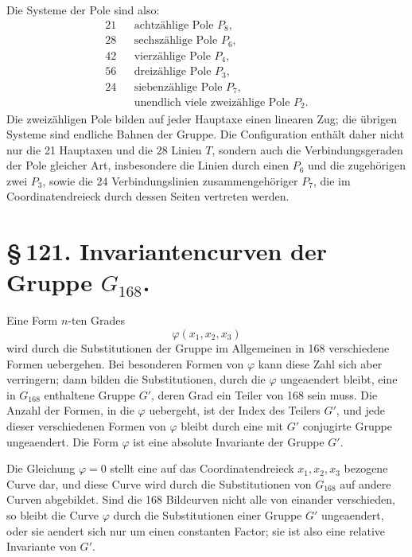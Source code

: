 \documentclass[11pt]{article}
\begin{document}
Die Systeme der Pole sind also:
\begin{equation}
\begin{array}{rcl}
21&&\text{achtzählige Pole }P_8,\\
28&&\text{sechszählige Pole }P_6,\\
42&&\text{vierzählige Pole }P_4,\\
56&&\text{dreizählige Pole }P_3,\\
24&&\text{siebenzählige Pole }P_7,\\
&&\text{unendlich viele zweizählige Pole }P_2.
\end{array}
\tag{2}
\end{equation}
Die zweizähligen Pole bilden auf jeder Hauptaxe einen linearen Zug; die übrigen Systeme sind endliche Bahnen der Gruppe. Die Configuration enthält daher nicht nur die 21 Hauptaxen und die 28 Linien \(T\), sondern auch die Verbindungsgeraden der Pole gleicher Art, insbesondere die Linien durch einen \(P_6\) und die zugehörigen zwei \(P_3\), sowie die 24 Verbindungslinien zusammengehöriger \(P_7\), die im Coordinatendreieck durch dessen Seiten vertreten werden.




\section*{\S\,121. Invariantencurven der Gruppe \(G_{168}\).}

Eine Form \(n\)-ten Grades
\begin{equation}
\varphi(x_1,x_2,x_3)
\end{equation}
wird durch die Substitutionen der Gruppe im Allgemeinen in 168 verschiedene Formen uebergehen. Bei besonderen Formen von \(\varphi\) kann diese Zahl sich aber verringern; dann bilden die Substitutionen, durch die \(\varphi\) ungeaendert bleibt, eine in \(G_{168}\) enthaltene Gruppe \(G'\), deren Grad ein Teiler von 168 sein muss. Die Anzahl der Formen, in die \(\varphi\) uebergeht, ist der Index des Teilers \(G'\), und jede dieser verschiedenen Formen von \(\varphi\) bleibt durch eine mit \(G'\) conjugirte Gruppe ungeaendert. Die Form \(\varphi\) ist eine absolute Invariante der Gruppe \(G'\).

Die Gleichung \(\varphi=0\) stellt eine auf das Coordinatendreieck \(x_1,x_2,x_3\) bezogene Curve dar, und diese Curve wird durch die Substitutionen von \(G_{168}\) auf andere Curven abgebildet. Sind die 168 Bildcurven nicht alle von einander verschieden, so bleibt die Curve \(\varphi\) durch die Substitutionen einer Gruppe \(G'\) ungeaendert, oder sie aendert sich nur um einen constanten Factor; sie ist also eine relative Invariante von \(G'\).
\end{document}
